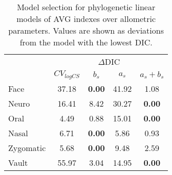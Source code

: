 \begin{table}[ht]
  \centering
  \caption{Model selection for phylogenetic linear models of AVG indexes over allometric parameters. Values are shown as deviations from the model with the lowest DIC. \label{tab:dic_allo_im}}
  \begin{tabular}{lcccc}
    \hline
    & \multicolumn{4}{c}{\small{$\Delta$DIC}} \\
    & $CV_{logCS}$ & $b_s$ & $a_s$ & $a_s + b_s$ \\ 
    \hline
    Face & 37.18 & {\bf 0.00} & 41.92 & 1.08 \\ 
    Neuro & 16.41 & 8.42 & 30.27 & {\bf 0.00} \\ 
    Oral & 4.49 & 0.88 & 15.01 & {\bf 0.00} \\ 
    Nasal & 6.71 & {\bf 0.00} & 5.86 & 0.93 \\ 
    Zygomatic & 5.68 & {\bf 0.00} & 9.48 & 2.59 \\ 
    Vault & 55.97 & 3.04 & 14.95 & {\bf 0.00} \\ 
    \hline
  \end{tabular}
\end{table}
